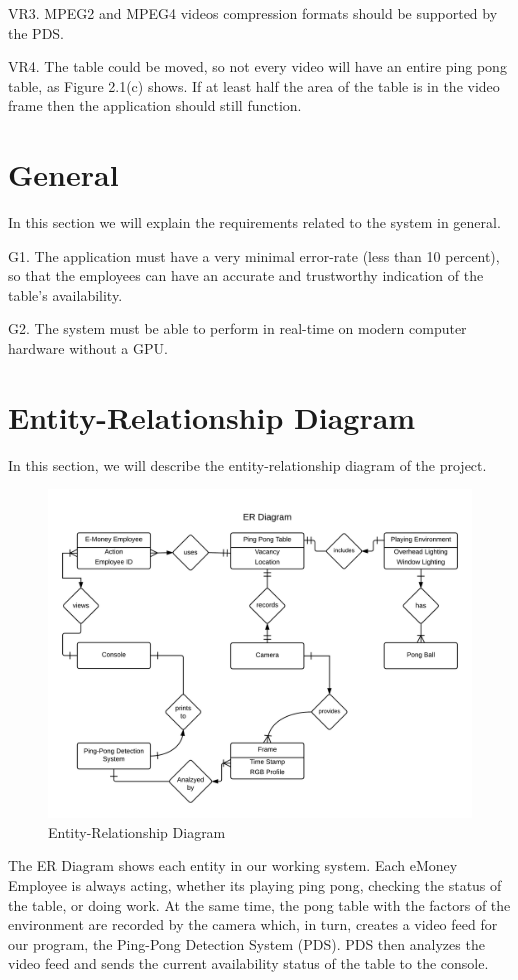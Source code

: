 \documentclass[11pt]{report}
\begin{document}
VR3.  MPEG2 and MPEG4 videos compression formats should be supported by the PDS.

VR4. The table could be moved, so not every video will have an entire ping pong table, as Figure 2.1(c) shows. If at least half the area of the table is in the video frame then the application should still function.

\section{General}
In this section we will explain the requirements related to the system in general.

G1. The application must have a very minimal error-rate (less than 10 percent), so that the employees can have an accurate and trustworthy indication of the table's availability.

G2. The system must be able to perform in real-time on modern computer hardware without a GPU.

\newpage
\section{Entity-Relationship Diagram}

In this section, we will describe the entity-relationship diagram of the project.\\

\begin{figure}[!htb]
\centering
\includegraphics[width=1.05\textwidth]{ERDiagram2.png}

\caption{ \small{Entity-Relationship Diagram}}

\end{figure}
The ER Diagram shows each entity in our working system. Each eMoney Employee is always acting, whether its playing ping pong, checking the status of the table, or doing work. At the same time, the pong table with the factors of the environment are recorded by the camera which, in turn, creates a video feed for our program, the Ping-Pong Detection System (PDS). PDS then analyzes the video feed and sends the current availability status of the table to the console.
\end{document}
